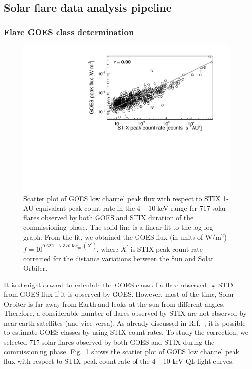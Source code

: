 \documentclass[referee]{aa} %
\begin{document}
\subsection{Solar flare data analysis pipeline}
\subsubsection{Flare GOES class determination}
\begin{figure}
  \centering
  \includegraphics[width=0.8\linewidth]{figures/goes_stix_flux_paper.pdf}
  \caption{Scatter plot of GOES low channel peak flux with respect to STIX 1-AU equivalent  peak count rate in the 4 -- 10 keV range
  for 717 solar flares observed by both GOES and STIX duration of the commissioning phase. 
  The solid line is a linear fit to the log-log graph. 
From the fit, we obtained 
the GOES flux (in units of W/m$^2$) $f = 10^{0.622 -7.376 \log_{10} (X^{'})}$,
where $X^{'}$ is STIX peak count rate corrected for the distance variations between the Sun and Solar Orbiter. 
}
\label{fig:goes-stix}
\end{figure}
It is straightforward to calculate the GOES
class of a flare observed by STIX from GOES flux if it is observed by GOES. 
However,  most of the time, Solar Orbiter is far away from Earth and looks at 
the sun from different angles. Therefore, a considerable number of flares observed by STIX
 are not observed by near-earth satellites (and vice versa). 
As already discussed in Ref.~\cite{andrea2021}, 
it is possible to estimate GOES classes by using STIX count rates.
To study the correction, we selected 717 solar flares observed by 
both GOES  and   STIX during the commissioning phase.   
Fig.~\ref{fig:goes-stix} shows the scatter plot of GOES low channel peak flux with respect to 
STIX peak count rate of the 4 -- 10 keV QL light curves. 
\end{document}

